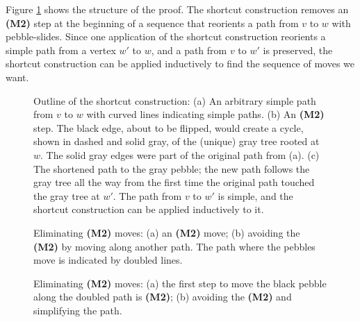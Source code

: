 \documentclass[Svgc,nospthms]{Svgc}
\newcommand{\reffig}[1]{Figure \ref{fig.#1}}
\begin{document}
	\reffig{m2-meta-picture} shows the structure of the proof.  The shortcut construction 
	removes an {\bf (M2)} step at the beginning of a sequence that 
	reorients a path from $v$ to $w$ with pebble-slides.  Since one application of the shortcut construction 
	reorients a simple path from a vertex $w'$ to $w$, and a path from $v$ to $w'$ is 
	preserved, the shortcut construction can be applied inductively to find the sequence of moves
	we want.
	
	\begin{figure}[htbp]
	\centering
	\hspace{.3in}
	\hspace{.3in}
	
	\caption{Outline of the shortcut construction: (a) An arbitrary simple path from $v$ to $w$ with
	curved lines indicating simple paths.
	(b) An {\bf (M2)} step. The black edge, about to be flipped, would create a cycle, 
	shown in dashed and solid gray, of the (unique) gray tree rooted at $w$.  The solid gray edges were part of the original path from (a).
	(c) The shortened path
	to the gray pebble; the new path follows the gray tree all the way from the first time the original
	path touched the gray tree at $w'$.  The path from $v$ to $w'$ is simple, and the shortcut construction
	can be applied inductively to it.}
	\label{fig.m2-meta-picture}
	\end{figure}
	
	\begin{figure}[htbp]
	\centering
	
	\caption{Eliminating {\bf (M2)} moves: (a) an {\bf (M2)} move; (b) avoiding the 
	{\bf (M2)} by moving along another path.  The path where the pebbles move is indicated
	by doubled lines.}
	\label{fig.m2-move-eliminate}
	\end{figure}
	
	\begin{figure}[htbp]
	\centering
	
	\caption{Eliminating {\bf (M2)} moves: (a) the first step to move the black pebble along the 
	doubled path is {\bf (M2)}; (b) avoiding the 
	{\bf (M2)} and simplifying the path.}
	\label{fig.m2-move-eliminate-2}
	\end{figure}
	
\end{document}
